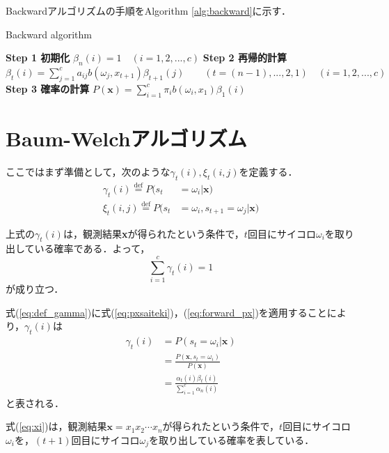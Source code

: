\documentclass[a4j]{jarticle}
\begin{document}
Backwardアルゴリズムの手順をAlgorithm \ref{alg:backward}に示す．

\begin{algorithm}
		\caption{Backward algorithm}
		\label{alg:backward}
		\begin{algorithmic}
			\STATE \textbf{Step 1 初期化}
			\STATE \quad $\beta_{n}(i) = 1 \quad (i = 1,2,...,c)$
			\STATE \textbf{Step 2 再帰的計算}
			\STATE \quad $\displaystyle \beta_{t}(i) = \sum_{j=1}^{c} a_{ij} b(\omega_{j}, x_{t+1}) \beta_{t+1}(j) \qquad (t=(n-1),...,2,1) \quad (i=1,2,...,c)$
			\STATE \textbf{Step 3 確率の計算}
			\STATE \quad $\displaystyle P(\mathbf{x}) = \sum_{i=1}^{c} \pi_{i} b(\omega_{i}, x_{1}) \beta_{1}(i)$
		\end{algorithmic}
\end{algorithm}


\newpage


\section{Baum-Welchアルゴリズム}
ここではまず準備として，次のような$\gamma_{t}(i), \xi_{t}(i, j)$を定義する．
\begin{align}
	\gamma_{t}(i) \overset{\mathrm{def}}{=} P(s_{t} & = \omega_{i} | \mathbf{x}) \label{eq:def_gamma} \\
	\xi_{t}(i, j) \overset{\mathrm{def}}{=} P(s_{t} & = \omega_{i}, s_{t+1} = \omega_{j}| \mathbf{x}) \label{eq:xi}
\end{align}

上式の$\gamma_{t}(i)$は，観測結果\textbf{x}が得られたという条件で，$t$回目にサイコロ$\omega_{i}$を取り出している確率である．よって，
\begin{equation}
\sum_{i=1}^{c} \gamma_{t}(i) = 1
\end{equation}
が成り立つ．

式(\ref{eq:def_gamma})に式(\ref{eq:pxsaiteki})，(\ref{eq:forward_px})を適用することにより，$\gamma_{t}(i)$は
\begin{align}
	\gamma_{t}(i) & = P(s_{t} = \omega_{i} | \mathbf{x}) \nonumber \\
	& = \frac{P(\mathbf{x}, s_{t}=\omega_{i})}{P(\mathbf{x})} \nonumber \\
	& = \frac{\alpha_{t}(i) \beta_{t}(i)}{\displaystyle \sum_{i=1}^{c} \alpha_{n}(i)}
\end{align}
と表される．

式(\ref{eq:xi})は，観測結果$\mathbf{x} = x_{1}x_{2}\cdots x_{n}$が得られたという条件で，$t$回目にサイコロ$\omega_{i}$を，$(t+1)$回目にサイコロ$\omega_{j}$を取り出している確率を表している．
\end{document}
